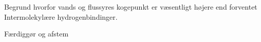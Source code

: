 \begin{flashcard}[Egenskab]{Begrund hvorfor vands og flussyres kogepunkt er væsentligt højere end forventet}
Intermolekylære hydrogenbindinger.
\end{flashcard}

\begin{flashcard}[Reaktion]{Færdiggør og afstem\\ \vspace{7pt}
\\
\\
\\
\\
}

\\
\\
\\
\\
\end{flashcard}